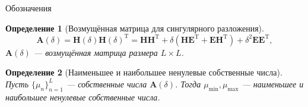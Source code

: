 \documentclass[notheorems, handout]{beamer}
\newtheorem{definition}{Определение}
\begin{document}
	\begin{frame}{Обозначения}
		\begin{definition}[Возмущённая матрица для сингулярного разложения]
			\begin{equation*}
				\mathbf{A}(\delta) = \mathbf{H}(\delta)\mathbf{H}(\delta)^\mathrm{T} = \mathbf{HH}^\mathrm{T} + \delta(\mathbf{HE}^\mathrm{T} + \mathbf{EH}^\mathrm{T}) + \delta^2\mathbf{EE}^\mathrm{T},
			\end{equation*}
			$\mathbf{A}(\delta)$ --- возмущённая матрица размера $L\times L$.
		\end{definition}
		\begin{definition}[Наименьшее и наибольшее ненулевые собственные числа]
			Пусть $\{\mu_n\}_{n=1}^L$ --- собственные числа $\mathbf{A}(\delta)$. Тогда $\mu_{\min}, \mu_{\max}$ --- наименьшее и наибольшее ненулевые собственные числа.
		\end{definition}
	\end{frame}
\end{document}
